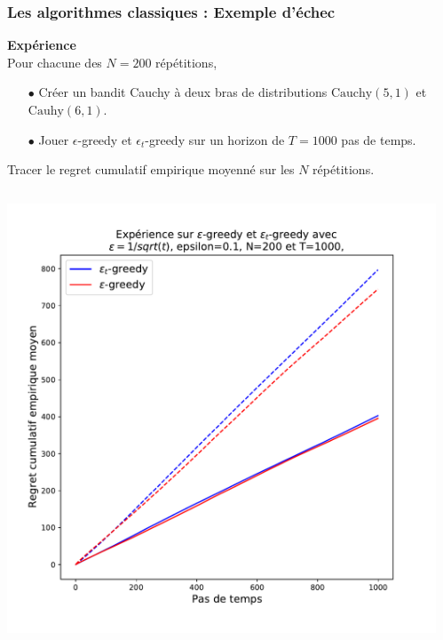 \documentclass[8pt, sans]{beamer}
\begin{document}
\begin{frame}
\frametitle{Les algorithmes classiques : Exemple d'échec}

\textbf{Expérience}\\
Pour chacune des $N=200$ répétitions,\\

\begin{itemize}

\item[$\bullet$] Créer un bandit Cauchy à deux bras de distributions $\mathrm{Cauchy}(5,1)$ et $\mathrm{Cauhy}(6,1).$

\item[$\bullet$] Jouer $\epsilon$-greedy et $\epsilon_t$-greedy sur un horizon de $T=1000$ pas de temps. 
\end{itemize}

Tracer le regret cumulatif empirique moyenné sur les $N$ répétitions.

\vfill
\pause

\begin{columns}[T] %
\begin{column}{0.5\linewidth}

\includegraphics[scale=0.3]{contre-exemple-epsilon-greedy.pdf}

\end{column}
\pause
\begin{column}{0.5\linewidth}


\end{column}
\end{columns}
\end{frame}
\end{document}
